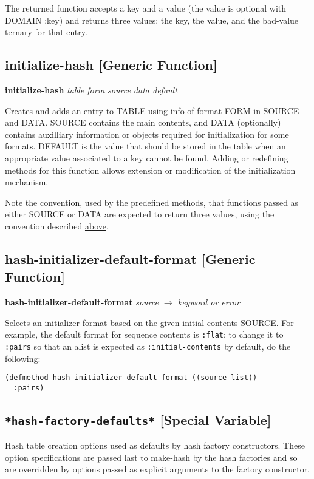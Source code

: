 \documentclass[11pt]{article}
\begin{document}
   The returned function accepts a key and a value (the value is optional
   with DOMAIN :key) and returns three values: the key, the value, and the
   bad-value ternary for that entry.
\subsection{initialize-hash [Generic Function]}
\label{sec-9-3}


   \textbf{initialize-hash} \emph{table form source data default} 

   Creates and adds an entry to TABLE using info of format FORM in SOURCE
   and DATA. SOURCE contains the main contents, and DATA (optionally)
   contains auxilliary information or objects required for initialization
   for some formats. DEFAULT is the value that should be stored in the table
   when an appropriate value associated to a key cannot be found. Adding or
   redefining methods for this function allows extension or modification of
   the initialization mechanism.

   Note the convention, used by the predefined methods, that functions
   passed as either SOURCE or DATA are expected to return three values,
   using the convention described \hyperref[sec-4-1]{above}.
\subsection{hash-initializer-default-format [Generic Function]}
\label{sec-9-4}


   \textbf{hash-initializer-default-format} \emph{source $\to$ keyword or error}

   Selects an initializer format based on the given initial contents SOURCE.
   For example, the default format for sequence contents is \texttt{:flat};
   to change it to \texttt{:pairs} so that an alist is expected as \texttt{:initial-contents}
   by default, do the following:


\begin{verbatim}
(defmethod hash-initializer-default-format ((source list))
  :pairs)
\end{verbatim}



   
\subsection{\texttt{*hash-factory-defaults*} [Special Variable]}
\label{sec-9-5}


   Hash table creation options used as defaults by hash factory
   constructors. These option specifications are passed last to make-hash by
   the hash factories and so are overridden by options passed as explicit
   arguments to the factory constructor.
   
\end{document}
